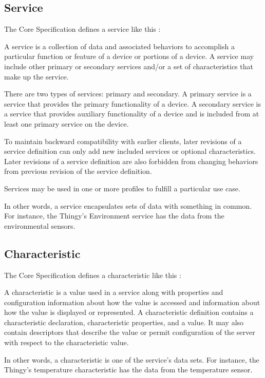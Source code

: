 \subsection{Service}
The \bt Core Specification defines a service like this \cite{bluetoothspecs}:
\begin{displayquote}
A service is a collection of data and associated behaviors to accomplish a particular function or feature of a device or portions of a device. A service may include other primary or secondary services and/or a set of characteristics that make up the service. 

There are two types of services: primary and secondary. A primary service is a service that provides the primary functionality of a device. A secondary service is a service that provides auxiliary functionality of a device and is included from at least one primary service on the device. 

To maintain backward compatibility with earlier clients, later revisions of a service definition can only add new included services or optional characteristics. Later revisions of a service definition are also forbidden from changing behaviors from previous revision of the service definition.

Services may be used in one or more profiles to fulfill a particular use case.
\end{displayquote}

In other words, a service encapsulates sets of data with something in common. For instance, the Thingy's Environment service has the data from the environmental sensors.
\subsection{Characteristic}
The \bt Core Specification defines a characteristic like this \cite{bluetoothspecs}:
\begin{displayquote}
A characteristic is a value used in a service along with properties and configuration information about how the value is accessed and information about how the value is displayed or represented. A characteristic definition contains a characteristic declaration, characteristic properties, and a value. It may also contain descriptors that describe the value or permit configuration of the server with respect to the characteristic value.
\end{displayquote}

In other words, a characteristic is one of the service's data sets. For instance, the Thingy's temperature characteristic has the data from the temperature sensor.

